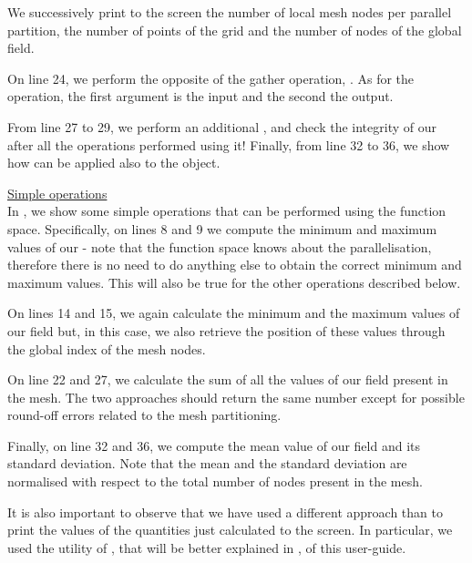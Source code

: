 \begin{description}
We successively print to the screen the number of local mesh nodes 
per parallel partition, the number of points of the grid and the 
number of nodes of the global field.

On line 24, we perform the opposite of the gather operation, 
. As for the  operation, the 
first argument is the input and the second the output.

From line 27 to 29, we perform an additional , 
and check the integrity of our  after all the 
operations performed using it! 
Finally, from line 32 to 36, we show how  can be applied 
also to the  object.

%

%
%
\item \underline{Simple operations}\\[0.5em]
%
In , we show some simple operations that 
can be performed using the  function space. Specifically, 
on lines 8 and 9 we compute the minimum and maximum values of our 
 - note that the function space knows about 
the parallelisation, therefore there is no need to do anything 
else to obtain the correct minimum and maximum values. This will
also be true for the other operations described below.

On lines 14 and 15, we again calculate the minimum and the maximum 
values of our field but, in this case, we also retrieve the position 
of these values through the global index of the mesh nodes.

On line 22 and 27, we calculate the sum of all the values of our 
field present in the mesh. The two approaches should return the 
same number except for possible round-off errors related to the 
mesh partitioning.

Finally, on line 32 and 36, we compute the mean value of our
field and its standard deviation. Note that the mean and the 
standard deviation are normalised with respect to the total 
number of nodes present in the mesh.

It is also important to observe that we have used a different 
approach than  to print the values of the quantities 
just calculated to the screen. In particular, we used the 
 utility of \Atlas, that will be better 
explained in , of this user-guide.
%

%
\end{description}
